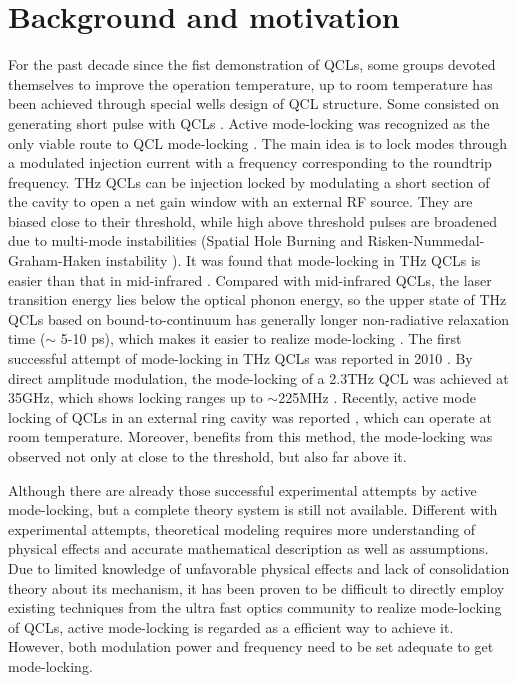 \documentclass[11pt,final]{scrbook}
\begin{document}
\section{Background and motivation}
For the past decade since the fist demonstration of QCLs, some groups devoted themselves to improve the operation temperature, up to room temperature has been achieved \cite{bai2011room} through special wells design of QCL structure. Some consisted on generating short pulse with QCLs \cite{wang2009mode}. Active mode-locking was recognized as the only viable route to QCL mode-locking \cite{revin2016active}. The main idea is to lock modes through a modulated injection current with a frequency corresponding to the roundtrip frequency. THz QCLs can be injection locked by modulating a short section of the cavity to open a net gain window with an external RF source. They are biased close to their threshold, while high above threshold pulses are broadened due to multi-mode instabilities (Spatial Hole Burning and Risken-Nummedal-Graham-Haken instability \cite{vukovic2016low}). It was found that mode-locking in THz QCLs is easier than that in mid-infrared \cite{wang2009mode}. Compared with mid-infrared QCLs, the laser transition energy lies below the optical phonon energy, so the upper state of THz QCLs based on bound-to-continuum has generally longer non-radiative relaxation time ($\sim$ 5-10 ps), which makes it easier to realize mode-locking \cite{barbieri2011coherent}. The first successful attempt of mode-locking in THz QCLs was reported in 2010 \cite{gellie2010injection}. By direct amplitude modulation, the mode-locking of a 2.3THz QCL was achieved at 35GHz, which shows locking ranges up to $\sim$225MHz  \cite{gellie2010injection}. Recently, active mode locking of QCLs in an external ring cavity was reported \cite{revin2016active}, which can operate at room temperature. Moreover, benefits from this method, the mode-locking was observed not only at close to the threshold, but also far above it. 

Although there are already those successful experimental attempts by active mode-locking, but a complete theory system is still not available. Different with experimental attempts, theoretical modeling requires more understanding of physical effects and accurate mathematical description as well as assumptions. Due to limited knowledge of unfavorable physical effects and lack of consolidation theory about its mechanism, it has been proven to be difficult to directly employ existing techniques from the ultra fast optics community to realize mode-locking of QCLs, active mode-locking is regarded as a efficient way to achieve it. However, both modulation power and frequency need to be set adequate to get mode-locking. 
\end{document}
